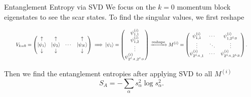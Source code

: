\documentclass[aspectratio=169]{beamer}
\begin{document}
\begin{frame}{Entanglement Entropy via SVD}
    We focus on the $k=0$ momentum block eigenstates to see the scar states. To find the singular values, we first reshape
    
    \vspace{0.15cm}
    
    \begin{equation*}
    \resizebox{0.95\textwidth}{!}{$\displaystyle
        V_{k=0} = 
        \begin{pmatrix}
            \uparrow & \uparrow & & \uparrow \\
            \ket{\psi_1} & \ket{\psi_2} & \cdots & \ket{\psi_N} \\
            \downarrow & \downarrow & & \downarrow
        \end{pmatrix}
        \implies
        \ket{\psi_i} = 
        \begin{pmatrix}
            \psi_{1, 1}^{(i)} \\
            \psi_{1, 2}^{(i)} \\
            \vdots \\
            \psi_{2^{L_A}, 2^{L_B}}^{(i)}
        \end{pmatrix}
        \xrightarrow{\text{reshape}}
        M^{(i)} = 
        \begin{pmatrix}
            \psi_{1, 1}^{(i)} & \cdots & \psi_{1, 2^{L_B}}^{(i)} \\
            \vdots & \ddots & \vdots \\
            \psi_{2^{L_A}, 1}^{(i)} & \cdots & \psi_{2^{L_A}, 2^{L_B}}^{(i)}
        \end{pmatrix}.$}
    \end{equation*}

    \vspace{0.45cm}

    Then we find the entanglement entropies after applying SVD to all $M^{(i)}$
    \begin{equation}
        S_A=-\sum_\alpha s^2_\alpha \log s^2_\alpha  .
    \end{equation}
\end{frame}
\end{document}
